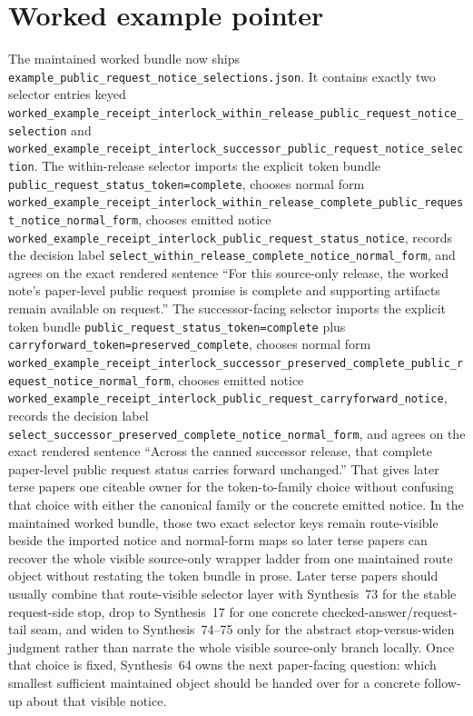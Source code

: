 \documentclass[11pt]{article}
\begin{document}
\section{Worked example pointer}
The maintained worked bundle now ships \nolinkurl{example_public_request_notice_selections.json}.\cite{series:workedexample}
It contains exactly two selector entries keyed \nolinkurl{worked_example_receipt_interlock_within_release_public_request_notice_selection} and \nolinkurl{worked_example_receipt_interlock_successor_public_request_notice_selection}.
The within-release selector imports the explicit token bundle \nolinkurl{public_request_status_token=complete}, chooses normal form \nolinkurl{worked_example_receipt_interlock_within_release_complete_public_request_notice_normal_form}, chooses emitted notice \nolinkurl{worked_example_receipt_interlock_public_request_status_notice}, records the decision label \nolinkurl{select_within_release_complete_notice_normal_form}, and agrees on the exact rendered sentence ``For this source-only release, the worked note's paper-level public request promise is complete and supporting artifacts remain available on request.''
The successor-facing selector imports the explicit token bundle \nolinkurl{public_request_status_token=complete} plus \nolinkurl{carryforward_token=preserved_complete}, chooses normal form \nolinkurl{worked_example_receipt_interlock_successor_preserved_complete_public_request_notice_normal_form}, chooses emitted notice \nolinkurl{worked_example_receipt_interlock_public_request_carryforward_notice}, records the decision label \nolinkurl{select_successor_preserved_complete_notice_normal_form}, and agrees on the exact rendered sentence ``Across the canned successor release, that complete paper-level public request status carries forward unchanged.''
That gives later terse papers one citeable owner for the token-to-family choice without confusing that choice with either the canonical family or the concrete emitted notice. In the maintained worked bundle, those two exact selector keys remain route-visible beside the imported notice and normal-form maps so later terse papers can recover the whole visible source-only wrapper ladder from one maintained route object without restating the token bundle in prose. Later terse papers should usually combine that route-visible selector layer with Synthesis~73 for the stable request-side stop, drop to Synthesis~17 for one concrete checked-answer/request-tail seam, and widen to Synthesis~74--75 only for the abstract stop-versus-widen judgment rather than narrate the whole visible source-only branch locally.\cite{series:publicrequestresponsepacketrefreshresponsepacketclosureverdicts,series:pairedterminalcitationdiscipline,series:pairedterminalcutoverrule}
Once that choice is fixed, Synthesis~64 owns the next paper-facing question: which smallest sufficient maintained object should be handed over for a concrete follow-up about that visible notice.
\end{document}
